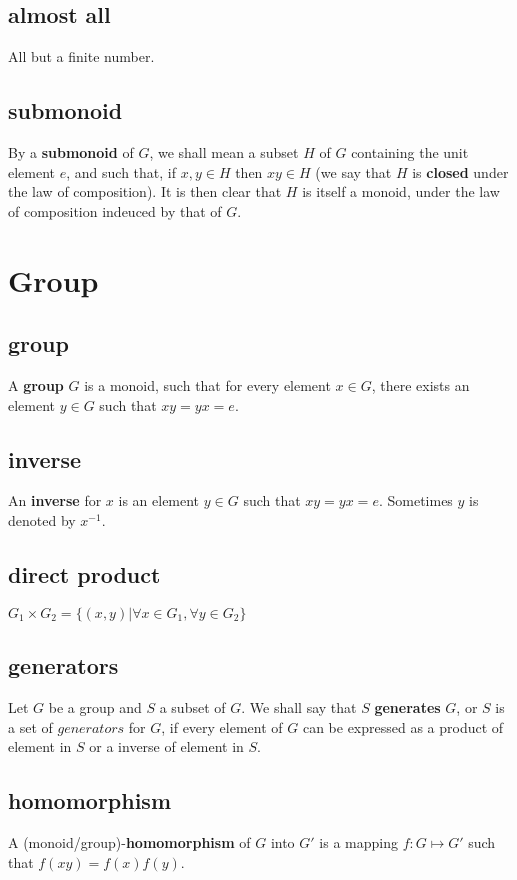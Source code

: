 \documentclass[11pt]{article}
\begin{document}
\subsection{almost all}
\label{sec:org058a1b8}
All but a finite number.
\subsection{submonoid}
\label{sec:org8968f60}
By a \textbf{submonoid} of \(G\), we shall mean a subset \(H\) of \(G\) containing the unit element \(e\),
and such that, if \(x, y \in H\) then \(xy \in H\) (we say that \(H\) is \textbf{closed} under the law of 
composition). It is then clear that \(H\) is itself a monoid, under the law of composition indeuced
by that of \(G\).
\section{Group}
\label{sec:orgc1cc2b8}
\subsection{group}
\label{sec:org4952431}
A \textbf{group} \(G\) is a monoid, such that for every element \(x\in G\), there exists an element \(y\in G\)
such that \(xy = yx = e\).
\subsection{inverse}
\label{sec:orga55d864}
An \textbf{inverse} for \(x\) is an element \(y\in G\) such that \(xy = yx = e\).
Sometimes \(y\) is denoted by \(x^{-1}\).
\subsection{direct product}
\label{sec:orgcf14a1d}
\(G_1 \times G_2 = \{(x, y) | \forall x\in G_1, \forall y\in G_2\}\)
\subsection{generators}
\label{sec:orga5d9b6d}
Let \(G\) be a group and \(S\) a subset of \(G\). We shall say that \(S\) \textbf{generates} \(G\), or \(S\) is 
a set of \(generators\) for \(G\), if every element of \(G\) can be expressed as a product of
element in \(S\) or a inverse of element in \(S\).
\subsection{homomorphism}
\label{sec:org6e44ee4}
A (monoid/group)-\textbf{homomorphism} of \(G\) into \(G'\) is a mapping \(f: G\mapsto G'\) such that \(f(xy) = f(x)f(y)\).
\end{document}
